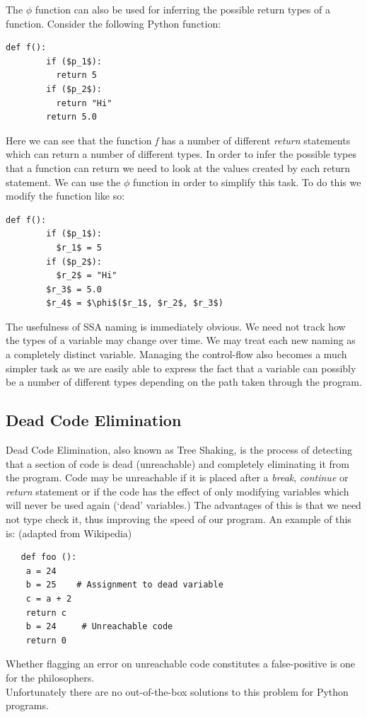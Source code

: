\documentclass[12pt, titlepage]{article}
\begin{document}
The $\phi$ function can also be used for inferring the possible return types of a function. Consider the following Python function:
\begin{lstlisting}[mathescape]
	def f():
		if ($p_1$):
		  return 5
		if ($p_2$):
		  return "Hi"
		return 5.0
\end{lstlisting}
Here we can see that the function \textit{f} has a number of different \textit{return} statements which can return a number of different types. In order to infer the possible types that a function can return we need to look at the values created by each return statement. We can use the $\phi$ function in order to simplify this task. To do this we modify the function like so:
\begin{lstlisting}[mathescape]
	def f():
		if ($p_1$):
		  $r_1$ = 5
		if ($p_2$):
		  $r_2$ = "Hi"
		$r_3$ = 5.0
		$r_4$ = $\phi$($r_1$, $r_2$, $r_3$)
\end{lstlisting}

The usefulness of SSA naming is immediately obvious. We need not track how the types of a variable may change over time. We may treat each new naming as a completely distinct variable. Managing the control-flow also becomes a much simpler task as we are easily able to express the fact that a variable can possibly be a number of different types depending on the path taken through the program.

\subsection{Dead Code Elimination}
Dead Code Elimination, also known as Tree Shaking, is the process of detecting that a section of code is dead (unreachable) and completely eliminating it from the program. Code may be unreachable if it is placed after a \textit{break}, \textit{continue} or \textit{return} statement or if the code has the effect of only modifying variables which will never be used again (`dead' variables.) The advantages of this is that we need not type check it, thus improving the speed of our program.
An example of this is: (adapted from Wikipedia)
\begin{lstlisting}
   def foo ():
   	a = 24
   	b = 25    # Assignment to dead variable
   	c = a + 2
   	return c
   	b = 24 	   # Unreachable code
   	return 0
\end{lstlisting}
Whether flagging an error on unreachable code constitutes a false-positive is one for the philosophers. \\
Unfortunately there are no out-of-the-box solutions to this problem for Python programs. \\
\end{document}
